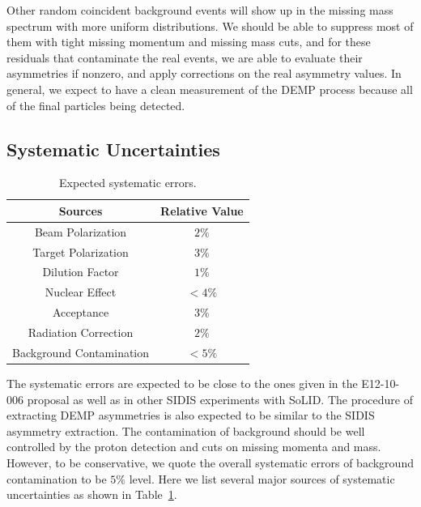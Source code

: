 Other random coincident background events will show up in the missing mass
spectrum with more uniform distributions. We should be able to suppress most of
them with tight missing momentum and missing mass cuts, and for these residuals
that contaminate the real events, we are able to evaluate their asymmetries if
nonzero, and apply corrections on the real asymmetry values. In general, we
expect to have a clean measurement of the DEMP process because all of the final
particles being detected.

\subsection{Systematic Uncertainties}

\begin{table}[!htp]
\centering
\begin{tabular}{|c|c|}
\hline
{\bf Sources}            & {\bf Relative Value} \\\hline
Beam Polarization        & $2\%$ \\\hline 
Target Polarization      & $3\%$ \\\hline 
Dilution Factor          & $1\%$ \\\hline 
Nuclear Effect           & $<4\%$ \\\hline 
Acceptance               & $3\%$ \\\hline
Radiation Correction     & $2\%$ \\\hline
Background Contamination & $<5\%$ \\\hline
\end{tabular}
\caption{\footnotesize{Expected systematic errors.}}\label{table:det_sys_err}
\end{table}

The systematic errors are expected to be close to the ones given in the
E12-10-006 proposal as well as in other SIDIS experiments with SoLID. The
procedure of extracting DEMP asymmetries is also expected to be similar to the
SIDIS asymmetry extraction.  The contamination of background should be well
controlled by the proton detection and cuts on missing momenta and mass.
However, to be conservative, we quote the overall systematic errors of
background contamination to be $5\%$ level.  Here we list several major sources
of systematic uncertainties as shown in Table~\ref{table:det_sys_err}.


